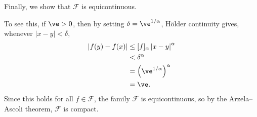 \documentclass[10pt]{mypackage}
\begin{document}
Finally, we show that $\mathcal{F}$ is equicontinuous.\newline

To see this, if $\ve > 0$, then by setting $\delta = \ve^{1/\alpha}$, Hölder continuity gives, whenever $\left\vert x-y \right\vert < \delta$,
\begin{align*}
  \left\vert f(y)-f(x) \right\vert &\leq [f]_{\alpha}\left\vert x-y \right\vert^{\alpha}\\
                                   &< \delta^{\alpha}\\
                                   &= \left( \ve^{1/\alpha} \right)^{\alpha}\\
                                   &= \ve.
\end{align*}
Since this holds for all $f\in \mathcal{F}$, the family $\mathcal{F}$ is equicontinuous, so by the Arzela--Ascoli theorem, $\mathcal{F}$ is compact.
\end{document}
